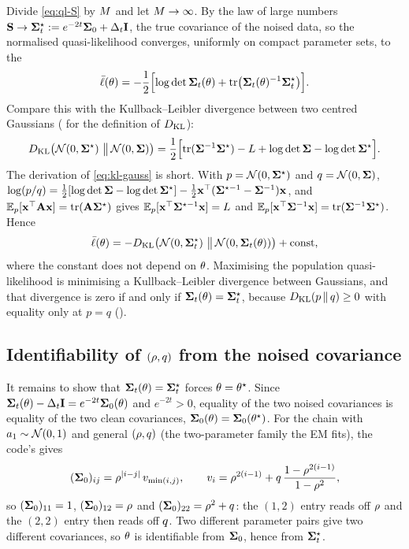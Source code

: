 Divide \cref{eq:ql-S} by $M$ and let $M\to\infty$. By the law of large numbers
$\mathbf{S}\to\mathbf{\Sigma}_t^{\star}:=e^{-2t}\mathbf{\Sigma}_0+\Delta_t\mathbf{I}$, the true covariance of the noised data,
so the normalised quasi-likelihood converges, uniformly on compact parameter sets, to the
\begin{equation}
  \bar\ell(\theta)=-\frac12\Bigl[\log\det\mathbf{\Sigma}_t(\theta)+\operatorname{tr}\bigl(\mathbf{\Sigma}_t(\theta)^{-1}\mathbf{\Sigma}_t^\star\bigr)\Bigr].
  \label{eq:ql-pop}
\end{equation}
Compare this with the Kullback--Leibler divergence between two centred Gaussians
( for the definition of $D_{\mathrm{KL}}$):
\begin{equation}
  D_{\mathrm{KL}}\bigl(\mathcal{N}\!\left(0,\mathbf{\Sigma}^\star\right)\,\big\|\,\mathcal{N}\!\left(0,\mathbf{\Sigma}\right)\bigr)
  =\frac12\Bigl[\operatorname{tr}(\mathbf{\Sigma}^{-1}\mathbf{\Sigma}^\star)-L+\log\det\mathbf{\Sigma}-\log\det\mathbf{\Sigma}^\star\Bigr].
  \label{eq:kl-gauss}
\end{equation}
The derivation of \cref{eq:kl-gauss} is short. With $p=\mathcal{N}\!\left(0,\mathbf{\Sigma}^\star\right)$ and
$q=\mathcal{N}\!\left(0,\mathbf{\Sigma}\right)$, $\log(p/q)=\tfrac12[\log\det\mathbf{\Sigma}-\log\det\mathbf{\Sigma}^\star]-\tfrac12\mathbf{x}^\top(\mathbf{\Sigma}^{\star-1}-\mathbf{\Sigma}^{-1})\mathbf{x}$, and
$\mathbb{E}_p[\mathbf{x}^\top\mathbf{A}\mathbf{x}]=\operatorname{tr}(\mathbf{A}\mathbf{\Sigma}^\star)$ gives
$\mathbb{E}_p[\mathbf{x}^\top\mathbf{\Sigma}^{\star-1}\mathbf{x}]=L$ and $\mathbb{E}_p[\mathbf{x}^\top\mathbf{\Sigma}^{-1}\mathbf{x}]=\operatorname{tr}(\mathbf{\Sigma}^{-1}\mathbf{\Sigma}^\star)$.
Hence
\begin{equation}
  \bar\ell(\theta)=-D_{\mathrm{KL}}\bigl(\mathcal{N}\!\left(0,\mathbf{\Sigma}_t^\star\right)\,\big\|\,\mathcal{N}\!\left(0,\mathbf{\Sigma}_t(\theta)\right)\bigr)+\text{const},
\end{equation}
where the constant does not depend on $\theta$. Maximising the population
quasi-likelihood is minimising a Kullback--Leibler divergence between Gaussians, and that
divergence is zero if and only if $\mathbf{\Sigma}_t(\theta)=\mathbf{\Sigma}_t^\star$, because
$D_{\mathrm{KL}}(p\,\|\,q)\ge0$ with equality only at $p=q$ ().

\subsection{Identifiability of \texorpdfstring{$(\rho,q)$}{(rho, q)} from the noised covariance}

It remains to show that $\mathbf{\Sigma}_t(\theta)=\mathbf{\Sigma}_t^\star$ forces $\theta=\theta^\star$. Since
$\mathbf{\Sigma}_t(\theta)-\Delta_t\mathbf{I}=e^{-2t}\mathbf{\Sigma}_0(\theta)$ and $e^{-2t}>0$, equality of the two noised
covariances is equality of the two clean covariances, $\mathbf{\Sigma}_0(\theta)=\mathbf{\Sigma}_0(\theta^\star)$.
For the chain with $a_1\sim\mathcal{N}\!\left(0,1\right)$ and general $(\rho,q)$ (the two-parameter
family the EM fits), the code's  gives
\begin{equation}
  (\mathbf{\Sigma}_0)_{ij}=\rho^{|i-j|}\,v_{\min(i,j)},\qquad
  v_i=\rho^{2(i-1)}+q\,\frac{1-\rho^{2(i-1)}}{1-\rho^2},
  \label{eq:sig0-general}
\end{equation}
so $(\mathbf{\Sigma}_0)_{11}=1$, $(\mathbf{\Sigma}_0)_{12}=\rho$ and $(\mathbf{\Sigma}_0)_{22}=\rho^2+q$: the
$(1,2)$ entry reads off $\rho$ and the $(2,2)$ entry then reads off $q$. Two
different parameter pairs give two different covariances, so $\theta$ is identifiable
from $\mathbf{\Sigma}_0$, hence from $\mathbf{\Sigma}_t^\star$.

